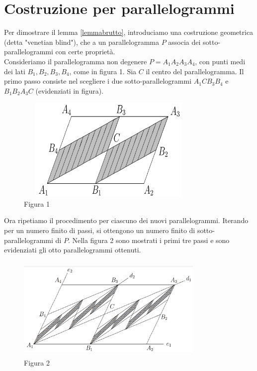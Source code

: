 \documentclass[a4paper, twoside,openright]{article}
\newcommand{\<}{\langle}
\renewcommand{\>}{\rangle}
\begin{document}
\newpage

\section{Costruzione per parallelogrammi}

Per dimostrare il lemma \ref{lemmabrutto}, introduciamo una costruzione geometrica (detta "venetian blind"), che a un parallelogramma $P$ associa dei sotto-parallelogrammi con certe proprietà.\\
Consideriamo il parallelogramma non degenere $P=A_{1} A_{2} A_{3} A_{4}$, con punti medi dei lati $B_{1}, B_{2}, B_{3}, B_{4}$, come in figura 1. Sia $C$ il centro del parallelogramma. Il primo passo consiste nel scegliere i due sotto-parallelogrammi $A_{1} C B_{3} B_{4}$ e $B_{1} B_{2} A_{3} C$ (evidenziati in figura).


	\begin{figure} [h!]
	\includegraphics[width=9cm, height=5cm]{passo1grigio.png}
	\centering
	\caption{Figura 1}
	\end{figure}


Ora ripetiamo il procedimento per ciascuno dei nuovi parallelogrammi. Iterando per un numero finito di passi, si ottengono un numero finito di sotto-parallelogrammi di $P$. Nella figura 2 sono mostrati i primi tre passi e sono evidenziati gli otto parallelogrammi ottenuti.\\

\begin{figure} [h!]
	\includegraphics[width=9cm, height=5cm]{passi123grigio.png}
	\centering
	\caption{Figura 2}
\end{figure}
\end{document}
